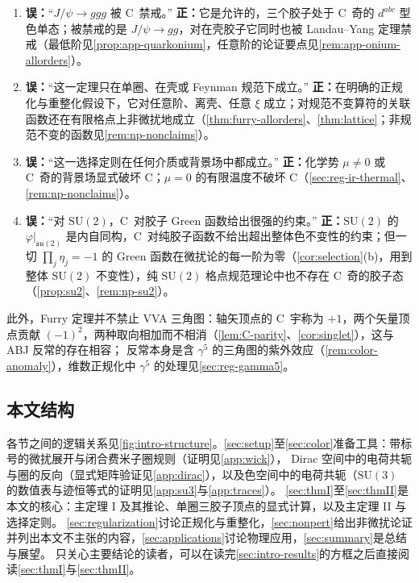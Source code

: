 \documentclass[UTF8,a4paper,11pt,fontset=fandol]{ctexart}
\theoremstyle{cplain}
\theoremstyle{cdefinition}
\theoremstyle{cremark}
\numberwithin{equation}{section}
\newcommand{\su}{\mathfrak{su}}
\begin{document}
\begin{tcolorbox}[enhanced,breakable,title=常见误解及其更正,fonttitle=\bfseries,
  colback=red!2!white,colframe=red!45!black,boxrule=0.7pt,arc=2pt,
  left=6pt,right=6pt,top=4pt,bottom=4pt,before skip=8pt,after skip=8pt]
\begin{enumerate}[label=\textbf{\arabic*.},leftmargin=1.8em,itemsep=2pt,topsep=1pt]
\item \textbf{误：}“$J/\psi\to ggg$ 被 C~禁戒。”\enspace
\textbf{正：}它是允许的，三个胶子处于 C~奇的 $d^{abc}$ 型色单态；被禁戒的是 $J/\psi\to gg$，对在壳胶子它同时也被 Landau--Yang 定理禁戒（最低阶见\cref{prop:app-quarkonium}，任意阶的论证要点见\cref{rem:app-onium-allorders}）。
\item \textbf{误：}“这一定理只在单圈、在壳或 Feynman 规范下成立。”\enspace
\textbf{正：}在明确的正规化与重整化假设下，它对任意阶、离壳、任意 $\xi$ 成立；对规范不变算符的关联函数还在有限格点上非微扰地成立（\cref{thm:furry-allorders}、\cref{thm:lattice}；非规范不变的函数见\cref{rem:np-nonclaims}）。
\item \textbf{误：}“这一选择定则在任何介质或背景场中都成立。”\enspace
\textbf{正：}化学势 $\mu\neq0$ 或 C~奇的背景场显式破坏 C；$\mu=0$ 的有限温度不破坏 C（\cref{sec:reg-ir-thermal}、\cref{rem:np-nonclaims}）。
\item \textbf{误：}“对 $\mathrm{SU}(2)$，C~对胶子 Green 函数给出很强的约束。”\enspace
\textbf{正：}$\mathrm{SU}(2)$ 的 $\varphi|_{\su(2)}$ 是内自同构，C~对纯胶子函数不给出超出整体色不变性的约束；但一切 $\prod_j\eta_j=-1$ 的 Green 函数在微扰论的每一阶为零（\cref{cor:selection}(b)，用到整体 $\mathrm{SU}(2)$ 不变性），纯 $\mathrm{SU}(2)$ 格点规范理论中也不存在 C~奇的胶子态（\cref{prop:su2}、\cref{rem:np-su2}）。
\end{enumerate}
\end{tcolorbox}

此外，Furry 定理并不禁止 VVA 三角图：轴矢顶点的 C~宇称为 $+1$，两个矢量顶点贡献 $(-1)^2$，两种取向相加而不相消（\cref{lem:C-parity}、\cref{cor:singlet}），这与 ABJ 反常的存在相容；
反常本身是含 $\gamma^5$ 的三角图的紫外效应（\cref{rem:color-anomaly}），维数正规化中 $\gamma^5$ 的处理见\cref{sec:reg-gamma5}。

\subsection{本文结构}\label{sec:intro-structure}

各节之间的逻辑关系见\cref{fig:intro-structure}。\cref{sec:setup}至\cref{sec:color}准备工具：带标号的微扰展开与闭合费米子圈规则（证明见\cref{app:wick}），
Dirac 空间中的电荷共轭与圈的反向（显式矩阵验证见\cref{app:dirac}），以及色空间中的电荷共轭（$\mathrm{SU}(3)$ 的数值表与迹恒等式的证明见\cref{app:su3}与\cref{app:traces}）。
\cref{sec:thmI}至\cref{sec:thmII}是本文的核心：主定理 I 及其推论、单圈三胶子顶点的显式计算，以及主定理 II 与选择定则。
\cref{sec:regularization}讨论正规化与重整化，\cref{sec:nonpert}给出非微扰论证并列出本文不主张的内容，\cref{sec:applications}讨论物理应用，\cref{sec:summary}是总结与展望。
只关心主要结论的读者，可以在读完\cref{sec:intro-results}的方框之后直接阅读\cref{sec:thmI}与\cref{sec:thmII}。
\end{document}
